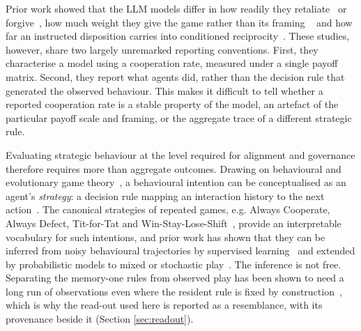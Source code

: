 \documentclass[11pt,a4paper]{article}
\begin{document}
Prior work showed that the LLM models differ
in how readily they retaliate~\cite{akata2025} or 
forgive~\cite{fontana2025nicer}, how much weight they give the game rather than
its framing  ~\cite{loreheydari2024strategic} and how far an instructed
disposition carries into conditioned
reciprocity~\cite{phelps2023investigating}. These studies, however, share two largely unremarked reporting conventions. First, they characterise a model using a cooperation rate, measured under a single payoff matrix. Second, they report what agents did, rather than the decision rule that generated the observed behaviour. This makes it difficult to tell whether a reported cooperation rate is a stable property of the model, an artefact of the particular payoff scale and framing, or the aggregate trace of a different strategic rule.

Evaluating strategic behaviour at the level required for alignment and governance therefore requires more than aggregate outcomes. Drawing on
behavioural and evolutionary game theory~\cite{sigmund:2010bo}, a behavioural
intention can be conceptualised as an agent's \emph{strategy}: a decision rule
mapping an interaction history to the next
action~\cite{han2013intention,diStefanoIntention2023,Han2012ALIFEjournal,fujimoto2019functional}.
The canonical strategies of repeated games, e.g. Always Cooperate, Always Defect,
Tit-for-Tat and Win-Stay-Lose-Shift~\cite{Axelrod1980Effective,sigmund:2010bo},
provide an interpretable vocabulary for such intentions, and prior work has
shown that they can be inferred from noisy behavioural trajectories by
supervised learning~\cite{han2013intention,diStefanoIntention2023} and extended by
probabilistic models to mixed or stochastic play~\cite{inferenceStrategies}.
The inference is not free. Separating the memory-one rules from observed play
has been shown to need a long run of observations even where the resident rule
is fixed by construction~\cite{kim2021win,hilbe2013memory}, which is why the
read-out used here is reported as a resemblance, with its provenance beside it
(Section \ref{sec:readout}).
\end{document}
